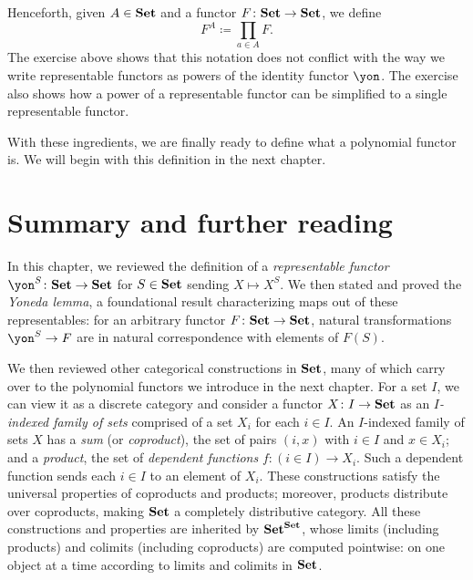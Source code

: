 \documentclass[Book-Poly]{subfiles}
\begin{document}
Henceforth, given $A\in\mathbf{Set}$ and a functor $F\colon\mathbf{Set}\to\mathbf{Set}$, we define
\[
F^A\coloneqq\prod_{a\in A}F.
\]
The exercise above shows that this notation does not conflict with the way we write representable functors as powers of the identity functor $\yon$.
The exercise also shows how a power of a representable functor can be simplified to a single representable functor.

With these ingredients, we are finally ready to define what a polynomial functor is.
We will begin with this definition in the next chapter.

\section{Summary and further reading}

In this chapter, we reviewed the definition of a \emph{representable functor} $\yon^S\colon\smset\to\smset$ for $S\in\mathbf{Set}$ sending $X\mapsto X^S$.
We then stated and proved the \emph{Yoneda lemma}, a foundational result characterizing maps out of these representables: for an arbitrary functor $F\colon\mathbf{Set}\to\mathbf{Set}$, natural transformations $\yon^S\to F$ are in natural correspondence with elements of $F(S)$.


We then reviewed other categorical constructions in $\mathbf{Set}$, many of which carry over to the polynomial functors we introduce in the next chapter.
For a set $I$, we can view it as a discrete category and consider a functor $X\colon I\to\mathbf{Set}$ as an \emph{$I$-indexed family of sets} comprised of a set $X_i$ for each $i\in I$.
An $I$-indexed family of sets $X$ has a \emph{sum} (or \emph{coproduct}), the set of pairs $(i,x)$ with $i\in I$ and $x\in X_i$; and a \emph{product}, the set of \emph{dependent functions} $f\colon(i\in I)\to X_i$.
Such a dependent function sends each $i\in I$ to an element of $X_i$.
These constructions satisfy the universal properties of coproducts and products; moreover, products distribute over coproducts, making $\mathbf{Set}$ a completely distributive category.
All these constructions and properties are inherited by $\mathbf{Set}^{\mathbf{Set}}$, whose limits (including products) and colimits (including coproducts) are computed pointwise: on one object at a time according to limits and colimits in $\mathbf{Set}$.

\end{document}
